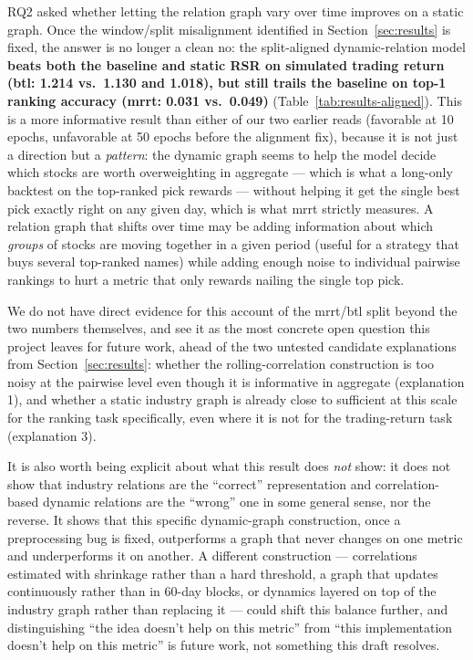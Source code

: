 \documentclass[12pt]{article}
\begin{document}
RQ2 asked whether letting the relation graph vary over time improves on a static graph. Once the
window/split misalignment identified in Section~\ref{sec:results} is fixed, the answer is no
longer a clean no: the split-aligned dynamic-relation model \textbf{beats both the baseline and
static RSR on simulated trading return (btl: 1.214 vs.\ 1.130 and 1.018), but still trails the
baseline on top-1 ranking accuracy (mrrt: 0.031 vs.\ 0.049)} (Table~\ref{tab:results-aligned}).
This is a more informative result than either of our two earlier reads (favorable at 10 epochs,
unfavorable at 50 epochs before the alignment fix), because it is not just a direction but a
\emph{pattern}: the dynamic graph seems to help the model decide which stocks are worth
overweighting in aggregate --- which is what a long-only backtest on the top-ranked pick rewards
--- without helping it get the single best pick exactly right on any given day, which is what
mrrt strictly measures. A relation graph that shifts over time may be adding information about
which \emph{groups} of stocks are moving together in a given period (useful for a strategy that
buys several top-ranked names) while adding enough noise to individual pairwise rankings to hurt
a metric that only rewards nailing the single top pick.

We do not have direct evidence for this account of the mrrt/btl split beyond the two numbers
themselves, and see it as the most concrete open question this project leaves for future work,
ahead of the two untested candidate explanations from Section~\ref{sec:results}: whether the
rolling-correlation construction is too noisy at the pairwise level even though it is informative
in aggregate (explanation 1), and whether a static industry graph is already close to sufficient
at this scale for the ranking task specifically, even where it is not for the trading-return task
(explanation 3).

It is also worth being explicit about what this result does \emph{not} show: it does not show that
industry relations are the ``correct'' representation and correlation-based dynamic relations are
the ``wrong'' one in some general sense, nor the reverse. It shows that this specific dynamic-graph
construction, once a preprocessing bug is fixed, outperforms a graph that never changes on one
metric and underperforms it on another. A different construction --- correlations estimated with
shrinkage rather than a hard threshold, a graph that updates continuously rather than in 60-day
blocks, or dynamics layered on top of the industry graph rather than replacing it --- could shift
this balance further, and distinguishing ``the idea doesn't help on this metric'' from ``this
implementation doesn't help on this metric'' is future work, not something this draft resolves.
\end{document}
